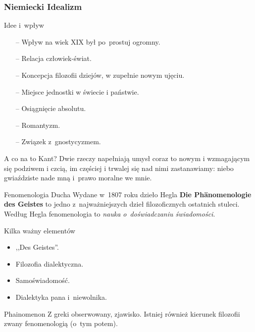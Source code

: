 \documentclass{beamer}  %
\begin{document}
\begin{frame}
  \frametitle{Niemiecki Idealizm}

  \begin{block}{Idee i~wpływ}
    \begin{itemize}
    \item[--] Wpływ na wiek XIX był po~prostuj ogromny.
    \item[--] Relacja człowiek-świat.
    \item[--] Koncepcja filozofii dziejów, w zupełnie nowym ujęciu.
    \item[--] Miejsce jednostki w świecie i państwie.
    \item[--] Osiągnięcie absolutu.
    \item[--] Romantyzm.
    \item[--] Związek z~gnostycyzmem.
    \end{itemize}
  \end{block}

  \begin{block}{A co na to Kant?}
    \pause Dwie rzeczy napełniają umysł coraz to nowym i wzmagającym
    się podziwem i czcią, im częściej i trwalej się nad nimi
    zastanawiamy: niebo gwiaździste nade mną i~prawo moralne we mnie.
  \end{block}

  \begin{block}{Fenomenologia Ducha}
    Wydane w~1807 roku dzieło Hegla \textbf{Die Ph\"{a}nomenologie \newline
    des Geistes} to jedno z~najważniejszych dzieł filozoficznych
    ostatnich stuleci. Według Hegla fenomenologia to \emph{nauka
    o~doświadczaniu świadomości}.
  \end{block}
  \pause

  \begin{block}{Kilka ważny elementów}
    \begin{itemize}
    \item ,,Des Geistes''.
    \item Filozofia dialektyczna.
    \item Samoświadomość.
    \item Dialektyka pana i~niewolnika.
    \end{itemize}
  \end{block}

  \begin{block}{Phainomenon}
    Z greki obserwowany, zjawisko. Istniej również kierunek filozofii
    zwany fenomenologią (o~tym potem).
  \end{block}
  \pause


\end{frame}
\end{document}
